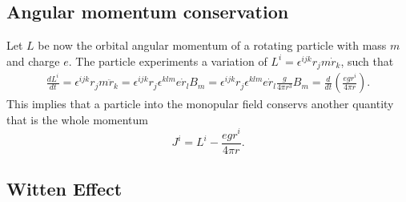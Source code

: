 \subsection{Angular momentum conservation}
Let $L$ be now the orbital angular momentum of a rotating particle with mass $m$ and charge $e$. The particle experiments a variation of $L^i=\epsilon^{ijk}r_jm\dot r_k$, such that
\begin{align}
\frac{dL^i}{dt}=\epsilon^{ijk}r_jm\ddot r_k=\epsilon^{ijk}r_j\epsilon^{klm}e\dot r_lB_m=\epsilon^{ijk}r_j\epsilon^{klm}e\dot r_l\frac{g}{4\pi r^3}B_m=\frac{d}{dt}\left(\frac{egr^i}{4\pi r}\right).
\end{align}
This implies that a particle into the monopular field conservs another quantity that is the whole momentum
\begin{equation}
J^i=L^i-\frac{egr^i}{4\pi r}.
\end{equation}
\subsection{Witten Effect}